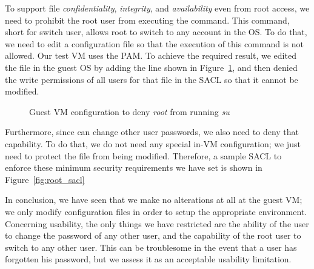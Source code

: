 \par To support file \emph{confidentiality}, \emph{integrity}, and \emph{availability} even from root access, we need to prohibit the root user from executing the  command. This command, short for switch user, allows root to switch to any account in the \ac{OS}. To do that, we need to edit a configuration file so that the execution of this command is not allowed. Our test \ac{VM} uses the \ac{PAM}. To achieve the required result, we edited the  file in the guest \ac{OS} by adding the line shown in Figure~\ref{fig:pam}, and then denied the write permissions of all users for that file in the \ac{SACL} so that it cannot be modified.

\begin{figure}[ht]
	\centering
	\caption{Guest \ac{VM} configuration to deny \emph{root} from running \emph{su}}
	\label{fig:pam}
\end{figure}

\par Furthermore, since  can change other user passwords, we also need to deny that capability. To do that, we do not need any special in-\ac{VM} configuration; we just need to protect the  file from being modified. Therefore, a sample \ac{SACL} to enforce these minimum security requirements we have set is shown in Figure~\ref{fig:root_sacl}


\par In conclusion, we have seen that we make no alterations at all at the guest \ac{VM}; we only modify configuration files in order to setup the appropriate environment. Concerning usability, the only things we have restricted are the ability of the  user to change the password of any other user, and the capability of the root user to switch to any other user. This can be troublesome in the event that a user has forgotten his password, but we assess it as an acceptable usability limitation.











